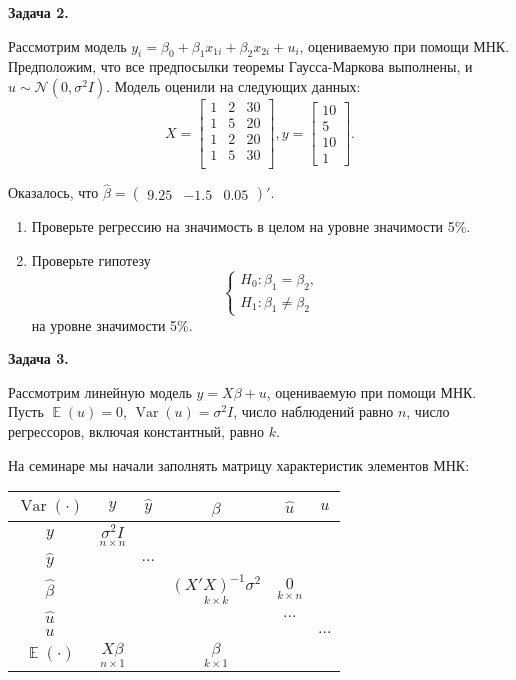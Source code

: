 \documentclass[10pt, a4paper]{extarticle}
\DeclareMathOperator{\Var}{Var}
\DeclareMathOperator{\E}{\mathbb{E}}
\begin{document}
	{\Large \textbf{Задача 2.}}
	
	Рассмотрим модель $y_i = \beta_0 + \beta_1x_{1i} + \beta_2x_{2i} + u_i$, оцениваемую при помощи МНК. Предположим, что все предпосылки теоремы Гаусса-Маркова выполнены, и $u \sim \mathcal{N}(0, \sigma^2I)$. Модель оценили на следующих данных:
	\[
	X = \begin{bmatrix}
		1 & 2 & 30 \\
		1 & 5 & 20 \\
		1 & 2 & 20 \\
		1 & 5 & 30 \\
	\end{bmatrix},
	y = \begin{bmatrix}
		10 \\
		5 \\
		10 \\
		1
	\end{bmatrix}.
	\]
	
	Оказалось, что $\hat{\beta} = \begin{pmatrix}
		9.25 & -1.5 & 0.05
	\end{pmatrix}'$.

	\begin{enumerate}[label=\alph*)]
		\item Проверьте регрессию на значимость в целом на уровне значимости 5\%.
		\item Проверьте гипотезу
		\[
		\begin{cases}
			H_0: \beta_1 = \beta_2, \\
			H_1: \beta_1 \ne \beta_2
		\end{cases}
		\]
		на уровне значимости 5\%.
	\end{enumerate}
	\vspace{1em}
	
	{\Large \textbf{Задача 3.}}
	
	Рассмотрим линейную модель $y = X\beta + u$, оцениваемую при помощи МНК. Пусть $\E(u) = 0$, $\Var(u) = \sigma^2 I$, число наблюдений равно $n$, число регрессоров, включая константный, равно $k$. 
	
	На семинаре мы начали заполнять матрицу характеристик элементов МНК:
	\begin{center}
		\begin{tabular}{c|ccccc}
			$\Var(\cdot)$ & $y$ & $\hat{y}$ & $\hat{\beta}$ & $\hat{u}$ & $u$ \\
			\hline
			$y$ & $\underset{n \times n}{\sigma^2I}$ &&&& \\
			$\hat{y}$ &&$\ldots$&&& \\
			$\hat{\beta}$ &&&$\underset{k\times k}{(X'X)^{-1}\sigma^2}$& $\underset{k \times n}{0}$& \\
			$\hat{u}$ &&&&$\ldots$& \\
			$u$ &&&&&$\ldots$ \\
			\hline
			$\E(\cdot)$ & $\underset{n\times1}{X\beta}$&&$\underset{k \times 1}{\beta}$&& \\
			\hline
		\end{tabular}
	\end{center}
	
\end{document}

